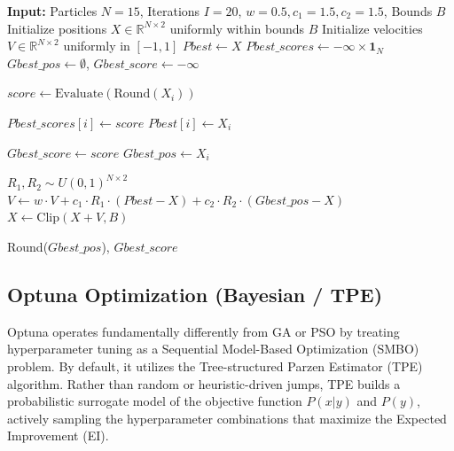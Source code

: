 \documentclass[12pt, a4paper]{article}
\begin{document}
\begin{algorithm}[H]
\caption{Particle Swarm Optimization (2D)}
\begin{algorithmic}[1]
\State \textbf{Input:} Particles $N=15$, Iterations $I=20$, $w=0.5, c_1=1.5, c_2=1.5$, Bounds $B$
\State Initialize positions $X \in \mathbb{R}^{N \times 2}$ uniformly within bounds $B$
\State Initialize velocities $V \in \mathbb{R}^{N \times 2}$ uniformly in $[-1, 1]$
\State $Pbest \leftarrow X$
\State $Pbest\_scores \leftarrow -\infty \times \mathbf{1}_{N}$
\State $Gbest\_pos \leftarrow \emptyset$, $Gbest\_score \leftarrow -\infty$

        \State $score \leftarrow \text{Evaluate}(\text{Round}(X_i))$
        
            \State $Pbest\_scores[i] \leftarrow score$
            \State $Pbest[i] \leftarrow X_i$
        \EndIf
        
            \State $Gbest\_score \leftarrow score$
            \State $Gbest\_pos \leftarrow X_i$
        \EndIf
    \EndFor
    
    \State $R_1, R_2 \sim U(0, 1)^{N \times 2}$
    \State $V \leftarrow w \cdot V + c_1 \cdot R_1 \cdot (Pbest - X) + c_2 \cdot R_2 \cdot (Gbest\_pos - X)$
    \State $X \leftarrow \text{Clip}(X + V, B)$
\EndFor

\State \Return Round($Gbest\_pos$), $Gbest\_score$
\end{algorithmic}
\end{algorithm}

\subsection{Optuna Optimization (Bayesian / TPE)}
Optuna operates fundamentally differently from GA or PSO by treating hyperparameter tuning as a Sequential Model-Based Optimization (SMBO) problem. By default, it utilizes the Tree-structured Parzen Estimator (TPE) algorithm. Rather than random or heuristic-driven jumps, TPE builds a probabilistic surrogate model of the objective function $P(x | y)$ and $P(y)$, actively sampling the hyperparameter combinations that maximize the Expected Improvement (EI).
\end{document}
